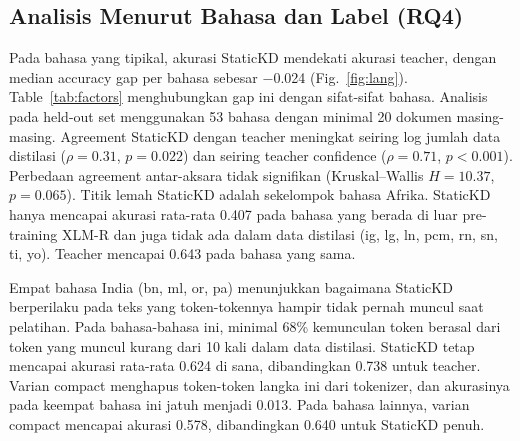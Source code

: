 \documentclass[journal]{IEEEtran}
\begin{document}
\subsection{Analisis Menurut Bahasa dan Label (RQ4)}
\label{sec:res-lang}
\begin{table}[!t]
\caption{Factors Behind Per-Language Performance}
\label{tab:factors}
\centering
\footnotesize
\setlength{\tabcolsep}{3pt}
\end{table}
Pada bahasa yang tipikal, akurasi StaticKD mendekati akurasi teacher, dengan median accuracy gap per bahasa sebesar $-$0.024 (Fig.~\ref{fig:lang}). Table~\ref{tab:factors} menghubungkan gap ini dengan sifat-sifat bahasa. Analisis pada held-out set menggunakan 53 bahasa dengan minimal 20 dokumen masing-masing. Agreement StaticKD dengan teacher meningkat seiring log jumlah data distilasi ($\rho=0.31$, $p=0.022$) dan seiring teacher confidence ($\rho=0.71$, $p<0.001$). Perbedaan agreement antar-aksara tidak signifikan (Kruskal--Wallis $H=10.37$, $p=0.065$). Titik lemah StaticKD adalah sekelompok bahasa Afrika. StaticKD hanya mencapai akurasi rata-rata 0.407 pada bahasa yang berada di luar pre-training XLM-R dan juga tidak ada dalam data distilasi (ig, lg, ln, pcm, rn, sn, ti, yo). Teacher mencapai 0.643 pada bahasa yang sama.

Empat bahasa India (bn, ml, or, pa) menunjukkan bagaimana StaticKD berperilaku pada teks yang token-tokennya hampir tidak pernah muncul saat pelatihan. Pada bahasa-bahasa ini, minimal 68\% kemunculan token berasal dari token yang muncul kurang dari 10 kali dalam data distilasi. StaticKD tetap mencapai akurasi rata-rata 0.624 di sana, dibandingkan 0.738 untuk teacher. Varian compact menghapus token-token langka ini dari tokenizer, dan akurasinya pada keempat bahasa ini jatuh menjadi 0.013. Pada bahasa lainnya, varian compact mencapai akurasi 0.578, dibandingkan 0.640 untuk StaticKD penuh.
\end{document}
